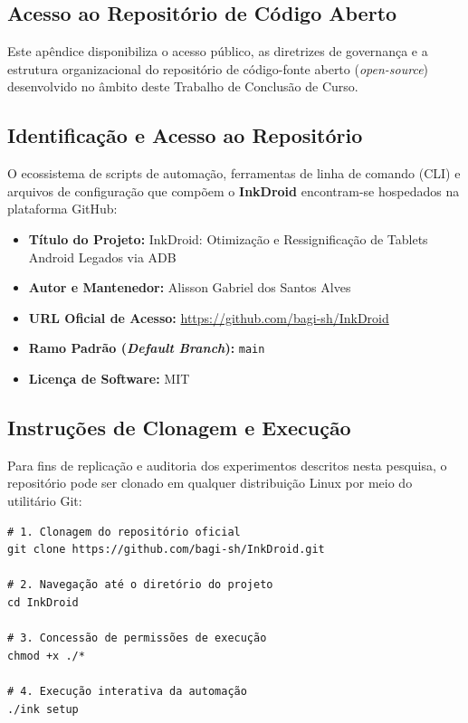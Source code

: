 \documentclass[
    12pt,
    openright,
    oneside,
    a4paper,
    english,
    brazilian
    ]{abntex2}
\begin{document}
\begin{apendicesenv}
\chapter{Acesso ao Repositório de Código Aberto}
\label{apendice:github}

Este apêndice disponibiliza o acesso público, as diretrizes de governança e a estrutura organizacional do repositório de código-fonte aberto (\textit{open-source}) desenvolvido no âmbito deste Trabalho de Conclusão de Curso.

\section*{Identificação e Acesso ao Repositório}

O ecossistema de scripts de automação, ferramentas de linha de comando (CLI) e arquivos de configuração que compõem o \textbf{InkDroid} encontram-se hospedados na plataforma GitHub:

\begin{itemize}
    \item \textbf{Título do Projeto:} InkDroid: Otimização e Ressignificação de Tablets Android Legados via ADB
    \item \textbf{Autor e Mantenedor:} Alisson Gabriel dos Santos Alves
    \item \textbf{URL Oficial de Acesso:} \url{https://github.com/bagi-sh/InkDroid}
    \item \textbf{Ramo Padrão (\textit{Default Branch}):} \texttt{main}
    \item \textbf{Licença de Software:} MIT
\end{itemize}

\section*{Instruções de Clonagem e Execução}

Para fins de replicação e auditoria dos experimentos descritos nesta pesquisa, o repositório pode ser clonado em qualquer distribuição Linux por meio do utilitário Git:

\begin{verbatim}
# 1. Clonagem do repositório oficial
git clone https://github.com/bagi-sh/InkDroid.git

# 2. Navegação até o diretório do projeto
cd InkDroid

# 3. Concessão de permissões de execução
chmod +x ./*

# 4. Execução interativa da automação
./ink setup
\end{verbatim}
\end{apendicesenv}
\end{document}
